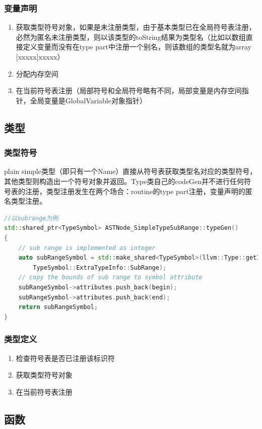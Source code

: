 \documentclass{article}
\begin{document}
\subsubsection{变量声明}
\begin{enumerate}
  \item 获取类型符号对象，如果是未注册类型，由于基本类型已在全局符号表注册，必然为匿名未注册类型，则以该类型的toString结果为类型名（比如以数组直接定义变量而没有在type part中注册一个别名，则该数组的类型名就为array [xxxxx]xxxxx）
  \item 分配内存空间
  \item 在当前符号表注册（局部符号和全局符号略有不同，局部变量是内存空间指针，全局变量是GlobalVariable对象指针）
\end{enumerate}

\subsection{类型}
\subsubsection{类型符号}
\par plain simple类型（即只有一个Name）直接从符号表获取类型名对应的类型符号，其他类型则构造出一个符号对象并返回。Type类自己的codeGen并不进行任何符号表的注册，类型注册发生在两个场合：routine的type part注册，变量声明的匿名类型注册。
\begin{lstlisting}[language=C++]
//以subrange为例
std::shared_ptr<TypeSymbol> ASTNode_SimpleTypeSubRange::typeGen()
{
    // sub range is implemented as integer
    auto subRangeSymbol = std::make_shared<TypeSymbol>(llvm::Type::getInt32Ty(*IRGenContext),
        TypeSymbol::ExtraTypeInfo::SubRange);
    // copy the bounds of sub range to symbol attribute
    subRangeSymbol->attributes.push_back(begin);
    subRangeSymbol->attributes.push_back(end);
    return subRangeSymbol;
}
\end{lstlisting}
\subsubsection{类型定义}
\begin{enumerate}
  \item 检查符号表是否已注册该标识符
  \item 获取类型符号对象
  \item 在当前符号表注册
\end{enumerate}

\subsection{函数}
\end{document}
